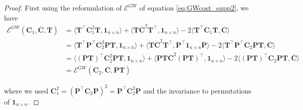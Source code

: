 \documentclass{article}
\newcommand{\scalar}[2]{\langle #1 , #2 \rangle}
\def\mC{{\bm{C}}}
\def\mP{{\bm{P}}}
\def\mT{{\bm{T}}}
\begin{document}
{\begin{proof}
First using the reformulation of $\mathcal{E}^{GW}$ of equation \ref{eq:GWcost_supp2}, we have
\begin{equation}\label{eq:invariant_GW}
\begin{split}
\mathcal{E}^{GW}(\mC_1, \overline{\mC}, \mT) &= \scalar{\mT^\top \mC^2_1 \mT}{\bm{1}_{\overline{n} \times \overline{n}}  } + \scalar{\mT \overline{\mC}^2 \mT^\top}{\bm{1}_{n \times n} } - 2 \scalar{\mT^\top \mC_1 \mT}{\overline{\mC}} \\
&=\scalar{\mT^\top \mP^\top \mC^2_2 \mP \mT}{\bm{1}_{\overline{n} \times \overline{n}}  } + \scalar{ \mT \overline{\mC}^2 \mT^\top}{ \mP^\top \bm{1}_{n \times n} \mP } - 2 \scalar{\mT^\top \mP^\top \mC_2 \mP \mT }{\overline{\mC}} \\
&=\scalar{(\mP\mT)^\top \mC^2_2 \mP \mT}{\bm{1}_{\overline{n} \times \overline{n}}  } + \scalar{ \mP\mT \overline{\mC}^2 (\mP\mT)^\top}{ \bm{1}_{n \times n} } - 2 \scalar{(\mP \mT)^\top \mC_2 \mP \mT }{\overline{\mC}} \\
&=	\mathcal{E}^{GW}(\mC_2, \overline{\mC}, \mP\mT)
\end{split}
\end{equation}

where we used $\mC_1^2 = (\mP^\top\mC_2\mP)^2 = \mP^\top\mC_2^2\mP$ and the invariance to permutations of $\bm{1}_{n \times n}$.


\end{proof}}
\end{document}

